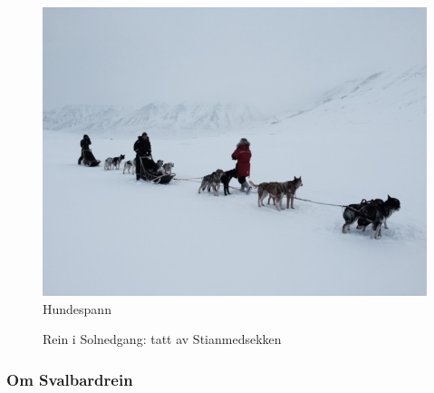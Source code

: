 \begin{figure}[h!]
	\centering
	\includegraphics[width=\textwidth]{Hundespann}
	\caption{Hundespann}
\label{fig:hundespann}

\end{figure}
\begin{figure}[H]
	\centering
\noindent{}	
	\caption*{Rein i Solnedgang: tatt av Stianmedsekken}
\label{fig:rein}
\end{figure}
\subsubsection{Om Svalbardrein}

